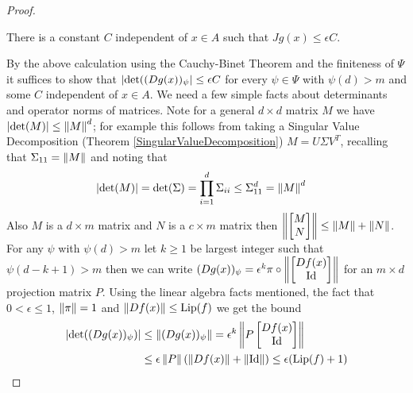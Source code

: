 \begin{proof}
\begin{clm}There is a constant $C$ independent of $x \in A$ such that $Jg(x) \leq \epsilon C$.
\end{clm}
By the above calculation using the Cauchy-Binet Theorem and the finiteness of $\Psi$ it suffices to show that $\left \vert \det((Dg(x))_\psi \right \vert  \leq \epsilon C$ for every $\psi \in \Psi$ with $\psi(d)>m$
and some $C$ independent of $x \in A$.   We need a few simple facts about determinants and operator norms of matrices. Note for a general $d \times d$ matrix $M$ we have $\left \vert \det(M) \right \vert \leq \left \lVert M \right \rVert^d$; for example this follows from taking a Singular Value Decomposition (Theorem \ref{SingularValueDecomposition}) $M = U \Sigma V^T$, recalling that $\Sigma_{11} = \left \lVert M \right \rVert$ and noting that 
\begin{align*}
\left \vert \det(M) \right \vert &= \det(\Sigma) = \prod_{i=1}^d \Sigma_{ii} \leq \Sigma_{11}^d = \left \lVert M \right \rVert^d
\end{align*}
Also $M$ is a $d \times m$ matrix and $N$ is a $c \times m$ matrix then $\left \lVert \begin{bmatrix} M \\ N \end{bmatrix} \right \rVert \leq \left \lVert M \right \rVert + \left \lVert N \right \rVert$.
For any $\psi$ with $\psi(d) > m$ let $k \geq 1$ be largest integer such that $\psi(d-k+1) > m$ then we can write $(Dg(x))_\psi = \epsilon^k \pi \circ \left \lVert \begin{bmatrix} Df(x) \\ \operatorname*{Id}\end{bmatrix} \right \rVert$ for an $m \times d$ projection matrix $P$.  Using the linear algebra facts mentioned, the fact that $0 < \epsilon \leq 1$, $\left \lVert \pi \right \rVert =1$ and $\left \lVert Df(x) \right \rVert \leq \operatorname*{Lip}(f)$ we get the bound
\begin{align*}
\left \vert \det((Dg(x))_\psi) \right \vert &\leq \left \lVert (Dg(x))_\psi \right \rVert = \epsilon^{k} \left \lVert P \begin{bmatrix} Df(x) \\ \operatorname*{Id}\end{bmatrix} \right \rVert \\
&\leq \epsilon \left \lVert P \right \rVert ( \left \lVert Df(x) \right \rVert + \left \lVert \operatorname*{Id} \right \rVert ) \leq \epsilon(\operatorname*{Lip}(f) + 1)
\end{align*}


\end{proof}

